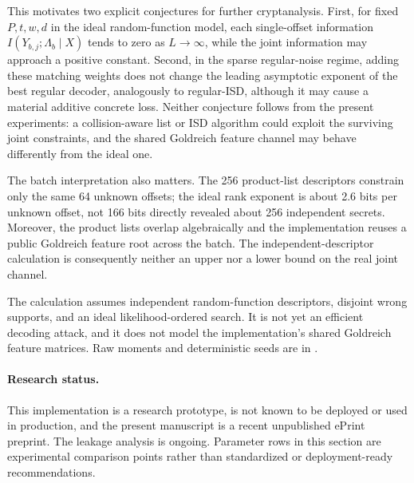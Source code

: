 This motivates two explicit conjectures for further cryptanalysis.  First,
for fixed $P,t,w,d$ in the ideal random-function model, each single-offset
information $I(Y_{b,j};\Lambda_b\mid X)$ tends to zero as $L\to\infty$, while
the joint information may approach a positive constant.  Second, in the sparse
regular-noise regime, adding these matching weights does not change the leading
asymptotic exponent of the best regular decoder, analogously to regular-ISD,
although it may cause a material additive concrete loss.  Neither conjecture
follows from the present experiments: a collision-aware list or ISD algorithm
could exploit the surviving joint constraints, and the shared Goldreich
feature channel may behave differently from the ideal one.

The batch interpretation also matters.  The 256 product-list descriptors
constrain only the same 64 unknown offsets; the ideal rank exponent is about
2.6 bits per unknown offset, not 166 bits directly revealed about 256
independent secrets.  Moreover, the product lists overlap algebraically and
the implementation reuses a public Goldreich feature root across the batch.
The independent-descriptor calculation is consequently neither an upper nor
a lower bound on the real joint channel.

The calculation assumes independent random-function descriptors, disjoint
wrong supports, and an ideal likelihood-ordered search.  It is not yet an
efficient decoding attack, and it does not model the implementation's shared
Goldreich feature matrices.  Raw moments and deterministic seeds are in
.

\paragraph{Research status.}
This implementation is a research prototype, is not known to be deployed or
used in production, and the present manuscript is a recent unpublished ePrint
preprint.  The leakage analysis is ongoing.  Parameter rows in this section are
experimental comparison points rather than standardized or deployment-ready
recommendations.
\fi
